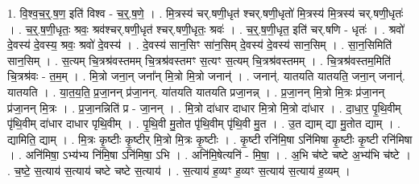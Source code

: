 \documentclass[17pt]{extarticle}
\begin{document}
1. वि॒श्व॒च॒र्॒.ष॒ण॒ इति॑ विश्व - च॒र्॒.ष॒णे॒ । . मि॒त्रस्य॑ चर्.षणी॒धृत॑ श्चर्.षणी॒धृतो॑ मि॒त्रस्य॑ मि॒त्रस्य॑ चर्.षणी॒धृतः॑ । . च॒र्॒.ष॒णी॒धृतः॒ श्रवः॒ श्रव॑श्चर्.षणी॒धृत॑ श्चर्.षणी॒धृतः॒ श्रवः॑ । . च॒र्॒.ष॒णी॒धृत॒ इति॑ चर्.षणि - धृतः॑ । . श्रवो॑ दे॒वस्य॑ दे॒वस्य॒ श्रवः॒ श्रवो॑ दे॒वस्य॑ । . दे॒वस्य॑ सान॒सिꣳ सा॑न॒सिम् दे॒वस्य॑ दे॒वस्य॑ सान॒सिम् । . सा॒न॒सिमिति॑ सान॒सिम् । . स॒त्यम् चि॒त्रश्र॑वस्तमम् चि॒त्रश्र॑वस्तमꣳ स॒त्यꣳ स॒त्यम् चि॒त्रश्र॑वस्तमम् । . चि॒त्रश्र॑वस्तम॒मिति॑ चि॒त्रश्र॑वः - त॒म॒म् । . मि॒त्रो जना॒न् जना᳚न् मि॒त्रो मि॒त्रो जनान्॑ । . जनान्॑. यातयति यातयति॒ जना॒न् जनान्॑. यातयति । . या॒त॒य॒ति॒ प्र॒जा॒नन् प्र॑जा॒नन्. या॑तयति यातयति प्रजा॒नन्न् । . प्र॒जा॒नन् मि॒त्रो मि॒त्रः प्र॑जा॒नन् प्र॑जा॒नन् मि॒त्रः । . प्र॒जा॒नन्निति॑ प्र - जा॒नन् । . मि॒त्रो दा॑धार दाधार मि॒त्रो मि॒त्रो दा॑धार । . दा॒धा॒र॒ पृ॒थि॒वीम् पृ॑थि॒वीम् दा॑धार दाधार पृथि॒वीम् । . पृ॒थि॒वी मु॒तोत पृ॑थि॒वीम् पृ॑थि॒वी मु॒त । . उ॒त द्याम् द्या मु॒तोत द्याम् । . द्यामिति॒ द्याम् । . मि॒त्रः कृ॒ष्टीः कृ॒ष्टीर् मि॒त्रो मि॒त्रः कृ॒ष्टीः । . कृ॒ष्टी रनि॑मि॒षा ऽनि॑मिषा कृ॒ष्टीः कृ॒ष्टी रनि॑मिषा । . अनि॑मिषा॒ ऽभ्य॑भ्य नि॑मि॒षा ऽनि॑मिषा॒ ऽभि । . अनि॑मि॒षेत्यनि॑ - मि॒षा॒ । . अ॒भि च॑ष्टे चष्टे अ॒भ्य॑भि च॑ष्टे । . च॒ष्टे॒ स॒त्याय॑ स॒त्याय॑ चष्टे चष्टे स॒त्याय॑ । . स॒त्याय॑ ह॒व्यꣳ ह॒व्यꣳ स॒त्याय॑ स॒त्याय॑ ह॒व्यम् । \newline
\end{document}
